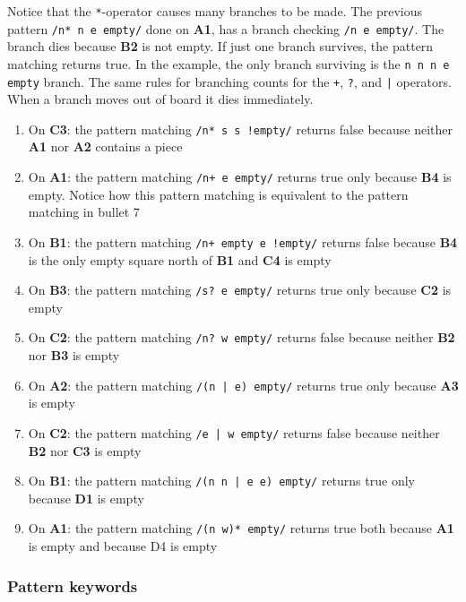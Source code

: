 Notice that the \texttt{*}-operator causes many branches to be made. The
previous pattern \texttt{/n* n e empty/} done on \textbf{A1}, has a branch checking
\texttt{/n e empty/}. The branch dies because \textbf{B2} is not empty. If just one
branch survives, the pattern matching returns true. In the example, the only branch
surviving is the \texttt{n n n e empty} branch. The same rules for branching
counts for the \texttt{+}, \texttt{?}, and \texttt{|} operators. When a branch
moves out of board it dies immediately.

\begin{enumerate}
  \item On \textbf{C3}: the pattern matching \texttt{/n* s s !empty/} returns
    false because neither \textbf{A1} nor \textbf{A2} contains a piece
  \item On \textbf{A1}: the pattern matching \texttt{/n+ e empty/} returns true
    only because \textbf{B4} is empty. Notice how this pattern matching is
    equivalent to the pattern matching in bullet 7
  \item On \textbf{B1}: the pattern matching \texttt{/n+ empty e !empty/}
    returns false because \textbf{B4} is the only empty square north of
    \textbf{B1} and \textbf{C4} is empty
  \item On \textbf{B3}: the pattern matching \texttt{/s? e empty/} returns true
    only because \textbf{C2} is empty 
  \item On \textbf{C2}: the pattern matching \texttt{/n? w empty/} returns false
    because neither \textbf{B2} nor \textbf{B3} is empty
  \item On \textbf{A2}: the pattern matching \texttt{/(n | e) empty/} returns
    true only because \textbf{A3} is empty
  \item On \textbf{C2}: the pattern matching \texttt{/e | w empty/} returns
    false because neither \textbf{B2} nor \textbf{C3} is empty
  \item On \textbf{B1}: the pattern matching \texttt{/(n n | e e) empty/}
    returns true only because \textbf{D1} is empty
  \item On \textbf{A1}: the pattern matching \texttt{/(n w)* empty/} returns
    true both because \textbf{A1} is empty and because D4 is empty
\end{enumerate}

\subsubsection{Pattern keywords}

